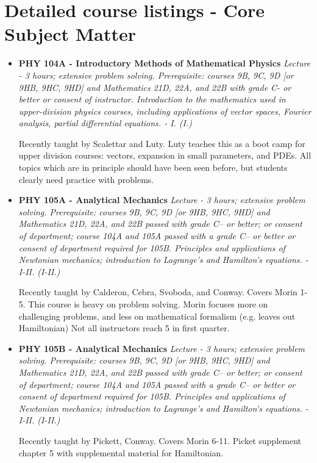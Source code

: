 \documentclass[12pt]{article}
\begin{document}
\section{Detailed course listings - Core Subject Matter}

\begin{itemize}
\item {\bf PHY 104A - Introductory Methods of Mathematical Physics}
{\it Lecture - 3 hours; extensive problem solving. Prerequisite: courses 9B, 9C, 9D [or 9HB, 9HC, 9HD] and Mathematics 21D, 22A, and 22B with grade C- or better or consent of instructor. Introduction to the mathematics used in upper-division physics courses, including applications of vector spaces, Fourier analysis, partial differential equations. - I. (I.)}

Recently taught by Scalettar and Luty.  Luty teaches this as a boot camp for upper division courses:  vectors, expansion in small parameters, and PDEs.  All topics which are in principle should have been seen before, but students clearly need practice with problems.

\item {\bf PHY 105A - Analytical Mechanics}
{\it Lecture - 3 hours; extensive problem solving. Prerequisite: courses 9B, 9C, 9D [or 9HB, 9HC, 9HD] and Mathematics 21D, 22A, and 22B passed with grade C– or better; or consent of department; course 104A and 105A passed with a grade C– or better or consent of department required for 105B. Principles and applications of Newtonian mechanics; introduction to Lagrange’s and Hamilton’s equations. - I-II. (I-II.)}

Recently taught by Calderon, Cebra, Svoboda, and Conway.  Covers Morin 1-5.  This course is heavy on problem solving.  Morin focuses more on challenging problems, and less on mathematical formalism (e.g. leaves out Hamiltonian)
Not all instructors reach 5 in first quarter.

\item {\bf PHY 105B - Analytical Mechanics}
{\it Lecture - 3 hours; extensive problem solving. Prerequisite: courses 9B, 9C, 9D [or 9HB, 9HC, 9HD] and Mathematics 21D, 22A, and 22B passed with grade C– or better; or consent of department; course 104A and 105A passed with a grade C– or better or consent of department required for 105B. Principles and applications of Newtonian mechanics; introduction to Lagrange’s and Hamilton’s equations. - I-II. (I-II.)}

Recently taught by Pickett, Conway.  Covers Morin 6-11.  Picket supplement chapter 5 with supplemental material for Hamiltonian.


\end{itemize}
\end{document}
